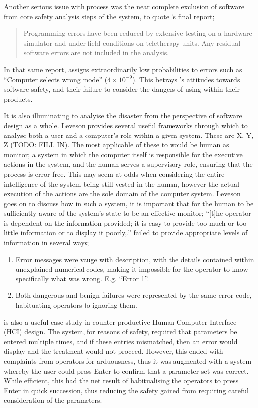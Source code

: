 \documentclass{cshonours}
\begin{document}
Another serious issue with process was the near complete exclusion of software from core safety analysis steps of the \ther system, to quote \aecl's final report; 
\begin{quote}
Programming errors have been reduced by extensive testing on a hardware simulator and under field conditions on teletherapy units. Any residual software errors are not included in the analysis. \cite[p.~4]{leveson1993investigation}
\end{quote}
In that same report, \aecl assigns extraordinarily low probabilities to errors such as ``Computer selects wrong mode'' ($4 \times 10^{-9}$). This betrays \aecl's attitudes towards software safety, and their failure to consider the dangers of using \soup within their products. 

It is also illuminating to analyise the \ther disaster from the perspective of software design as a whole. Leveson \cite{safeware} provides several useful frameworks through which to analyse both a user and a computer's role within a given system. These are X, Y, Z (TODO: FILL IN). The most applicable of these to \ther would be human as monitor; a system in which the computer itself is responsible for the executive actions in the system, and the human serves a supervisory role, ensuring that the process is error free. This may seem at odds when considering the entire intelligence of the system being still vested in the human, however the actual execution of the actions are the sole domain of the computer system. Leveson goes on to discuss how in such a system, it is important that for the human to be sufficiently aware of the system's state to be an effective monitor; ``[t]he operator is dependent on the information provided; it is easy to provide too much or too little information or to display it poorly,.'' \cite[p.~TODO]{safeware} \ther failed to provide appropriate levels of information in several ways;
\begin{enumerate}
  \item Error messages were vauge with description, with the details contained within unexplained numerical codes, making it impossible for the operator to know specifically what was wrong. E.g. ``Error 1''.
  \item Both dangerous and benign failures were represented by the same error code, habituating operators to ignoring them.
\end{enumerate}

\ther is also a useful case study in counter-productive Human-Computer Interface (HCI) design. The system, for reasons of safety, required that parameters be entered multiple times, and if these entries mismatched, then an error would display and the treatment would not proceed. However, this ended with complaints from operators for arduousness, thus it was augmented with a system whereby the user could press Enter to confirm that a parameter set was correct. While efficient, this had the net result of habitualising the operators to press Enter in quick succession, thus reducing the safety gained from requiring careful consideration of the parameters. \cite[p.~274]{saferworld}
\end{document}

